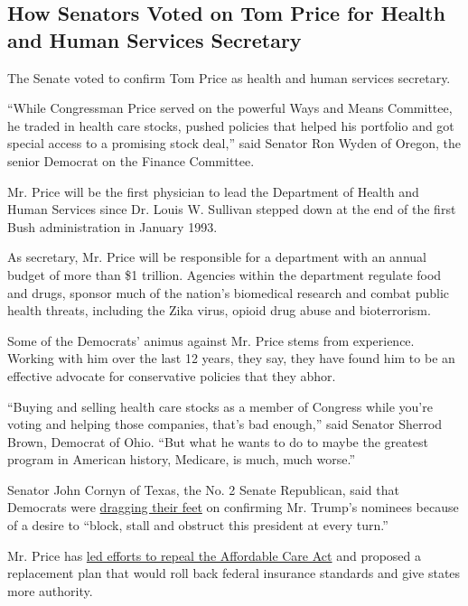 \hypertarget{how-senators-voted-on-tom-price-for-health-and-human-services-secretary}{%
\subsection{How Senators Voted on Tom Price for Health and Human
Services
Secretary}\label{how-senators-voted-on-tom-price-for-health-and-human-services-secretary}}

The Senate voted to confirm Tom Price as health and human services
secretary.

``While Congressman Price served on the powerful Ways and Means
Committee, he traded in health care stocks, pushed policies that helped
his portfolio and got special access to a promising stock deal,'' said
Senator Ron Wyden of Oregon, the senior Democrat on the Finance
Committee.

Mr. Price will be the first physician to lead the Department of Health
and Human Services since Dr. Louis W. Sullivan stepped down at the end
of the first Bush administration in January 1993.

As secretary, Mr. Price will be responsible for a department with an
annual budget of more than \$1 trillion. Agencies within the department
regulate food and drugs, sponsor much of the nation's biomedical
research and combat public health threats, including the Zika virus,
opioid drug abuse and bioterrorism.

Some of the Democrats' animus against Mr. Price stems from experience.
Working with him over the last 12 years, they say, they have found him
to be an effective advocate for conservative policies that they abhor.

``Buying and selling health care stocks as a member of Congress while
you're voting and helping those companies, that's bad enough,'' said
Senator Sherrod Brown, Democrat of Ohio. ``But what he wants to do to
maybe the greatest program in American history, Medicare, is much, much
worse.''

Senator John Cornyn of Texas, the No. 2 Senate Republican, said that
Democrats were
\href{https://www.nytimes.com/2017/01/31/us/politics/democrats-seize-on-acting-attorney-generals-firing-to-try-to-block-nominee.html}{dragging
their feet} on confirming Mr. Trump's nominees because of a desire to
``block, stall and obstruct this president at every turn.''

Mr. Price has
\href{https://www.nytimes.com/2016/11/28/us/politics/tom-price-secretary-health-and-human-services.html}{led
efforts to repeal the Affordable Care Act} and proposed a replacement
plan that would roll back federal insurance standards and give states
more authority.

